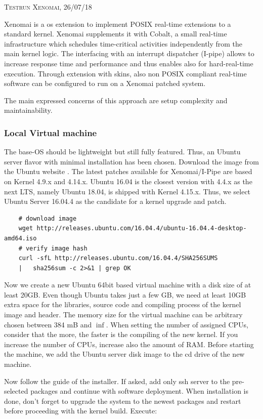 \documentclass[]{scrartcl}
\begin{document}
{\small\textsc{Testrun Xenomai, 26/07/18} \bigskip}

Xenomai is a os extension to implement POSIX real-time extensions to a standard kernel. Xenomai supplements it with Cobalt, a small real-time infrastructure which schedules time-critical activities independently from the main kernel logic. The interfacing with an interrupt dispatcher (I-pipe) allows to increase response time and performance and thus enables also for hard-real-time execution. Through extension with skins, also non POSIX compliant real-time software can be configured to run on a Xenomai patched system.

The main expressed concerns of this approach are setup complexity and maintainability.

\subsubsection{Local Virtual machine}
\label{sec:xenoinst}

The base-OS should be lightweight but still fully featured. Thus, an Ubuntu server flavor with minimal installation has been chosen. Download the image from the Ubuntu website \cite{ubuntu02}. The latest patches available for Xenomai/I-Pipe are based on Kernel 4.9.x and 4.14.x. Ubuntu 16.04 is the closest version with 4.4.x as the next LTS, namely Ubuntu 18.04, is shipped with Kernel 4.15.x. Thus, we select Ubuntu Server 16.04.4 as the candidate for a kernel upgrade and patch.

\begin{verbatim}
	# download image
	wget http://releases.ubuntu.com/16.04.4/ubuntu-16.04.4-desktop-amd64.iso
	# verify image hash
	curl -sfL http://releases.ubuntu.com/16.04.4/SHA256SUMS
	|	sha256sum -c 2>&1 | grep OK
\end{verbatim}

Now we create a new Ubuntu 64bit based virtual machine with a disk size of at least 20GB. Even though Ubuntu takes just a few GB, we need at least 10GB extra space for the libraries, source code and compiling process of the kernel image and header. 
The memory size for the virtual machine can be arbitrary chosen between 384 mB and $\inf$. When setting the number of assigned CPUs, consider that the more, the faster is the compiling of the new kernel. If you increase the number of CPUs, increase also the amount of RAM.
Before starting the machine, we add the Ubuntu server disk image to the cd drive of the new machine.

Now follow the guide of the installer. If asked, add only ssh server to the pre-selected packages and continue with software deployment. When installation is done, don't forget to upgrade the system to the newest packages and restart before proceeding with the kernel build. Execute:
\end{document}
